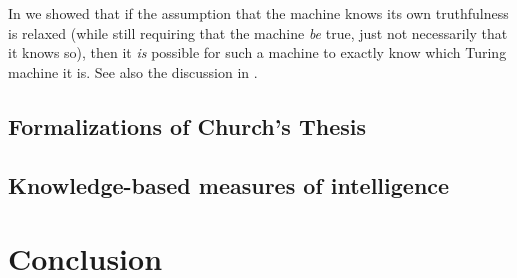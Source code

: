 \documentclass[runningheads]{llncs}
\begin{document}
In \cite{alexander2014machine} we showed that if the assumption that the
machine knows its own truthfulness is relaxed (while still requiring that
the machine \emph{be} true, just not necessarily that it knows so),
then it \emph{is} possible for such a machine to exactly know which
Turing machine it is. See also the discussion in \cite{aldini2015theory}.



\subsection{Formalizations of Church's Thesis}

\cite{flagg1985church}
\cite{carlson2016collapsing}

\subsection{Knowledge-based measures of intelligence}

\cite{alexander2019measuring}
\cite{alexander2020agi}

\section{Conclusion}
\label{conclusionsection}



\end{document}
